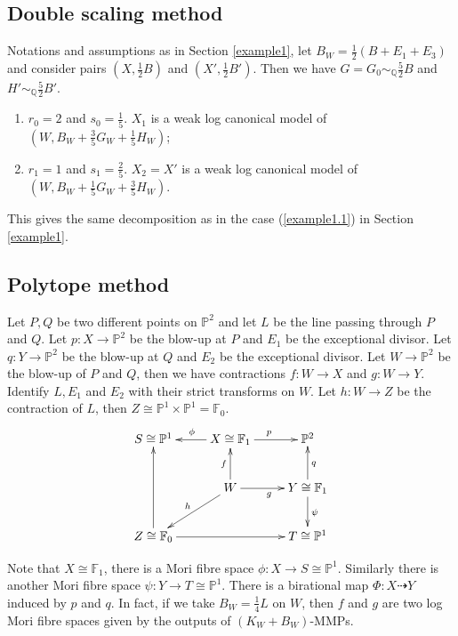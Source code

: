 \documentclass[11pt]{amsart}
\begin{document}
\subsection{Double scaling method}
Notations and assumptions as in Section \ref{example1}, let $B_{W}=\frac{1}{2}(B+E_{1}+E_{3})$ and consider pairs $(X,\frac{1}{2}B)$ and $(X',\frac{1}{2}B')$. Then we have $G=G_{0}\sim_{\mathbb{Q}}\frac{5}{2}B$ and $H'\sim_{\mathbb{Q}}\frac{5}{2}B'$.

\begin{enumerate}
  \item $r_{0}=2$ and $s_{0}=\frac{1}{5}$. $X_{1}$ is a weak log canonical model of $(W,B_{W}+\frac{3}{5}G_{W}+\frac{1}{5}H_{W})$;
  \item  $r_{1}=1$ and $s_{1}=\frac{2}{5}$. $X_{2}= X'$ is a weak log canonical model of $(W,B_{W}+\frac{1}{5}G_{W}+\frac{3}{5}H_{W})$.
\end{enumerate} 

This gives the same decomposition as in the case (\ref{example1.1}) in  Section \ref{example1}.

\subsection{Polytope method}
Let  $P,Q$ be two different points on $\mathbb{P}^{2}$ and let $L$ be the line passing through $P$ and $Q$. Let $p:X\to \mathbb{P}^{2}$ be the blow-up at $P$ and $E_{1}$ be the exceptional divisor. Let $q:Y\to \mathbb{P}^{2}$ be the blow-up at $Q$ and $E_{2}$ be the exceptional divisor. Let $W\to \mathbb{P}^{2}$ be the blow-up of $P$ and $Q$, then we have contractions $f:W\to X$ and $g:W\to Y$. Identify $L,E_{1}$ and $E_{2}$ with their strict transforms on  $W$. Let $h:W\to Z$ be the contraction of $L$, then $Z\cong \mathbb{P}^{1} \times \mathbb{P}^{1}=\mathbb{F}_{0}$.
\[
  \xymatrix{
    S\cong \mathbb{P}^{1}&X\cong \mathbb{F}_{1}\ar[l]_{\phi}\ar[r]^{p} & \mathbb{P}^{2} \\
                         &W\ar[u]^{f}\ar[r]_{g}\ar[ld]_{h} & Y\cong \mathbb{F}_{1}\ar[u]_{q}\ar[d]^{\psi}\\
    Z\cong \mathbb{F}_{0}\ar[uu]\ar[rr]&&T\cong \mathbb{P}^{1}
  }
\]

Note that $X\cong \mathbb{F}_{1}$, there is a  Mori fibre space $\phi:X\to S \cong \mathbb{P}^{1}$. Similarly there is another Mori fibre space $\psi:Y\to T\cong \mathbb{P}^{1}$. There is a birational map $\Phi:X\dashrightarrow  Y$ induced by $p$ and $q$. In fact, if we take $B_{W}=\frac{1}{4}L$ on $W$, then $f$ and $g$ are two log Mori fibre spaces given by the outputs of $(K_{W}+B_{W})$-MMPs.
\end{document}
